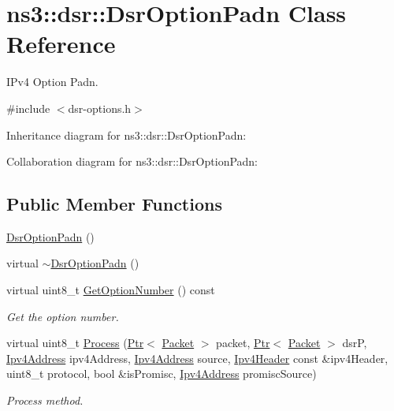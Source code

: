 \hypertarget{classns3_1_1dsr_1_1DsrOptionPadn}{}\section{ns3\+:\+:dsr\+:\+:Dsr\+Option\+Padn Class Reference}
\label{classns3_1_1dsr_1_1DsrOptionPadn}


I\+Pv4 Option Padn.  




{\ttfamily \#include $<$dsr-\/options.\+h$>$}



Inheritance diagram for ns3\+:\+:dsr\+:\+:Dsr\+Option\+Padn\+:


Collaboration diagram for ns3\+:\+:dsr\+:\+:Dsr\+Option\+Padn\+:
\subsection*{Public Member Functions}
\begin{DoxyCompactItemize}
\item 
\hyperlink{classns3_1_1dsr_1_1DsrOptionPadn_ac3e52bc3b55f98b7325b2cbe67051c84}{Dsr\+Option\+Padn} ()
\item 
virtual \hyperlink{classns3_1_1dsr_1_1DsrOptionPadn_a3de59b084dfde467471bc75eaa864c90}{$\sim$\+Dsr\+Option\+Padn} ()
\item 
virtual uint8\+\_\+t \hyperlink{classns3_1_1dsr_1_1DsrOptionPadn_a9ff63248fb3ef6db969cb5ae537dec9d}{Get\+Option\+Number} () const 
\begin{DoxyCompactList}\small\item\em Get the option number. \end{DoxyCompactList}\item 
virtual uint8\+\_\+t \hyperlink{classns3_1_1dsr_1_1DsrOptionPadn_af1007861938eea5b276fbd07aec8c1ff}{Process} (\hyperlink{classns3_1_1Ptr}{Ptr}$<$ \hyperlink{classns3_1_1Packet}{Packet} $>$ packet, \hyperlink{classns3_1_1Ptr}{Ptr}$<$ \hyperlink{classns3_1_1Packet}{Packet} $>$ dsrP, \hyperlink{classns3_1_1Ipv4Address}{Ipv4\+Address} ipv4\+Address, \hyperlink{classns3_1_1Ipv4Address}{Ipv4\+Address} source, \hyperlink{classns3_1_1Ipv4Header}{Ipv4\+Header} const \&ipv4\+Header, uint8\+\_\+t protocol, bool \&is\+Promisc, \hyperlink{classns3_1_1Ipv4Address}{Ipv4\+Address} promisc\+Source)
\begin{DoxyCompactList}\small\item\em Process method. \end{DoxyCompactList}\end{DoxyCompactItemize}
